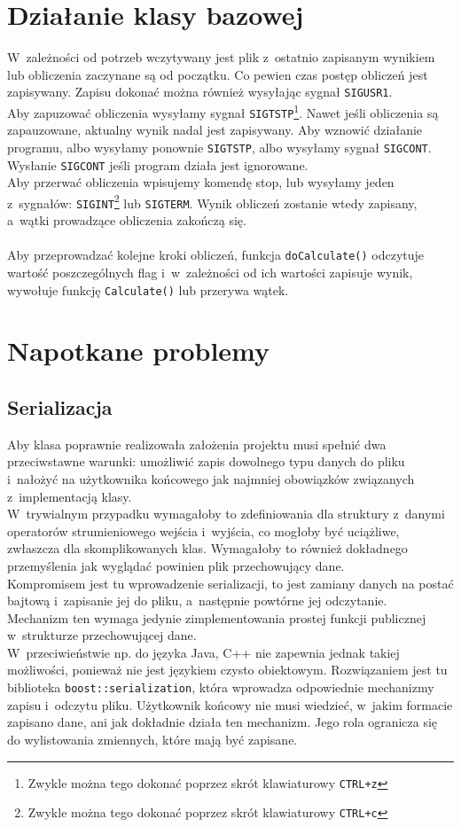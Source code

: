 \documentclass[a4paper]{article}
\begin{document}
\section{Działanie klasy bazowej}
W~zależności od potrzeb wczytywany jest plik z~ostatnio zapisanym wynikiem lub obliczenia zaczynane są od początku.
Co pewien czas postęp obliczeń jest zapisywany. 
Zapisu dokonać można również wysyłając sygnał \texttt{SIGUSR1}.\\
Aby zapuzować obliczenia wysyłamy sygnał \texttt{SIGTSTP}\footnote{Zwykle można tego dokonać poprzez skrót klawiaturowy \texttt{CTRL+z}}. 
Nawet jeśli obliczenia są zapauzowane, aktualny wynik nadal jest zapisywany.
Aby wznowić działanie programu, albo wysyłamy ponownie \texttt{SIGTSTP}, albo wysyłamy sygnał \texttt{SIGCONT}.
Wysłanie \texttt{SIGCONT} jeśli program działa jest ignorowane.\\
Aby przerwać obliczenia wpisujemy komendę stop, lub wysyłamy jeden z~sygnałów: \texttt{SIGINT}\footnote{Zwykle można tego dokonać poprzez skrót klawiaturowy \texttt{CTRL+c}} lub \texttt{SIGTERM}.
Wynik obliczeń zostanie wtedy zapisany, a~wątki prowadzące obliczenia zakończą się.\\
~\\
Aby przeprowadzać kolejne kroki obliczeń, funkcja \texttt{doCalculate()} odczytuje wartość poszczególnych flag i~w~zależności od ich wartości zapisuje wynik, wywołuje funkcję \texttt{Calculate()} lub przerywa wątek.
\section{Napotkane problemy}
\subsection{Serializacja}
Aby klasa poprawnie realizowała założenia projektu musi spełnić dwa przeciwstawne warunki: umożliwić zapis dowolnego typu danych do pliku i~nałożyć na użytkownika końcowego jak najmniej obowiązków związanych z~implementacją klasy.\\
W~trywialnym przypadku wymagałoby to zdefiniowania dla struktury z~danymi operatorów strumieniowego wejścia i~wyjścia, co mogłoby być uciążliwe, zwłaszcza dla skomplikowanych klas.
Wymagałoby to również dokładnego przemyślenia jak wyglądać powinien plik przechowujący dane.\\
Kompromisem jest tu wprowadzenie serializacji, to jest zamiany danych na postać bajtową i~zapisanie jej do pliku, a~następnie powtórne jej odczytanie.\\
Mechanizm ten wymaga jedynie zimplementowania prostej funkcji publicznej w~strukturze przechowującej dane.\\
W~przeciwieństwie np. do języka Java, C++ nie zapewnia jednak takiej możliwości, ponieważ nie jest językiem czysto obiektowym.
Rozwiązaniem jest tu biblioteka \texttt{boost::serialization}, która wprowadza odpowiednie mechanizmy zapisu i~odczytu pliku.
Użytkownik końcowy nie musi wiedzieć, w~jakim formacie zapisano dane, ani jak dokładnie działa ten mechanizm. 
Jego rola ogranicza się do wylistowania zmiennych, które mają być zapisane. 
\end{document}

